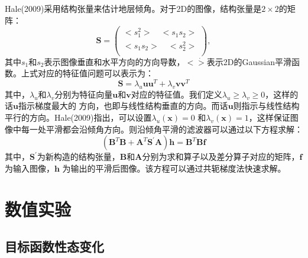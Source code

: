 Hale(2009)采用结构张量来估计地层倾角。对于2D的图像，结构张量是$2\times2$的矩阵：
\begin{equation}
        \mathbf{S}=
        \begin{pmatrix}
                < s^2_1 > \quad <s_1s_2 >\\
                < s_1s_2 > \quad < s^2_2 >\\
        \end{pmatrix},
        \label{eq:StructureTensor}
\end{equation}
其中$s_1$和$s_2$表示图像垂直和水平方向的方向导数，$<\dot>$表示2D的Gaussian平滑函数。上式对应的特征值问题可以表示为：
\begin{equation}
	\mathbf{S}=\lambda_u\mathbf{u}\mathbf{u}^T+\lambda_v\mathbf{v}\mathbf{v}^T
        \label{eq:EigenValueVector}
\end{equation}
其中，$\lambda_u$和$\lambda_v$分别为特征向量$\mathbf{u}$和$\mathbf{v}$对应的特征值。我们定义$\lambda_u\ge\lambda_v\ge0$，这样的话$\mathbf{u}$指示梯度最大的
方向，也即与线性结构垂直的方向。而话$\mathbf{u}$则指示与线性结构平行的方向。Hale(2009)指出，可以设置$\lambda_u(\mathbf{x})=0$
和$\lambda_v(\mathbf{x})=1$，这样保证图像中每一处平滑都会沿倾角方向。则沿倾角平滑的滤波器可以通过以下方程求解：
\begin{equation}
	(\mathbf{B}^T\mathbf{B}+\mathbf{A}^T\mathbf{S}^{\prime}\mathbf{A})\mathbf{h}=\mathbf{B}^T\mathbf{B}\mathbf{f}
        \label{eq:SparseMatrixSystem}
\end{equation}
其中，$\mathbf{S}^{\prime}$为新构造的结构张量，$\mathbf{B}$和$\mathbf{A}$分别为求和算子以及差分算子对应的矩阵，$\mathbf{f}$为输入图像，$\mathbf{h}$
为输出的平滑后图像。该方程可以通过共轭梯度法快速求解。

\section{数值实验}
\subsection{目标函数性态变化}
